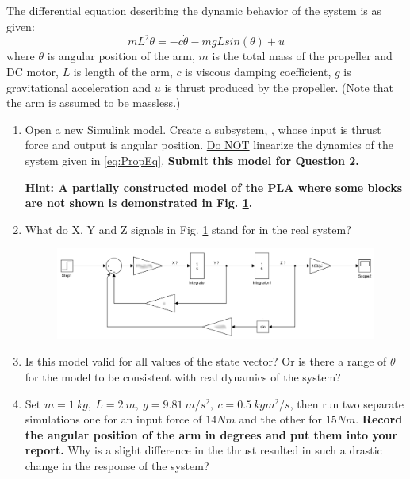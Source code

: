 \documentclass[12pt]{article}
\theoremstyle{plain}
\theoremstyle{definition}
\begin{document}
\begin{enumerate}
	The differential equation describing the dynamic behavior of the system is as given:	
	\begin{equation} \label{eq:PropEq}
	m L^2 \ddot{\theta} = -c\dot{\theta} - m g L sin(\theta) + u
	\end{equation}	
	where $\theta$ is angular position of the arm, $m$ is the total mass of the propeller and DC motor, $L$ is length of the arm, $c$ is viscous damping coefficient, $g$ is gravitational acceleration and $u$ is thrust produced by the propeller. (Note that the arm is assumed to be massless.)
	
	\begin{enumerate}
		\item Open a new Simulink model. Create a subsystem, \cite{SimulinkSubsystem}, whose input is thrust force and output is angular position. \underline{Do NOT} linearize the dynamics of the system given in \eqref{eq:PropEq}. 
		\textbf{Submit this model for Question 2.}
		
		\textbf{Hint: A partially constructed model of the PLA where some blocks are not shown is demonstrated in Fig. \ref{fig:PropSim}.}
		
		\item  What do X, Y and Z signals in Fig. \ref{fig:PropSim} stand for in the real system?

		\begin{figure}[!htb]
			\centering
			\includegraphics[width=1\textwidth]{Figures/PropellerSimModel.png}
			\caption{}
			\centering
			\label{fig:PropSim}
		\end{figure}
			
		\item Is this model valid for all values of the state vector? Or is there a range of $\theta$ for the model to be consistent with real dynamics of the system?							
		
		\item Set $m = 1\ kg,\ L = 2\ m,\ g = 9.81\ m/s^2,\ c = 0.5\ kgm^2/s$, then run two separate simulations one for an input force of $14 Nm$ and the other for $15 Nm$. \textbf{Record the angular position of the arm in degrees and put them into your report.} Why is a slight difference in the thrust resulted in such a drastic change in the response of the system? 

	\end{enumerate}
		
\end{enumerate}

\pagebreak



\end{document}
